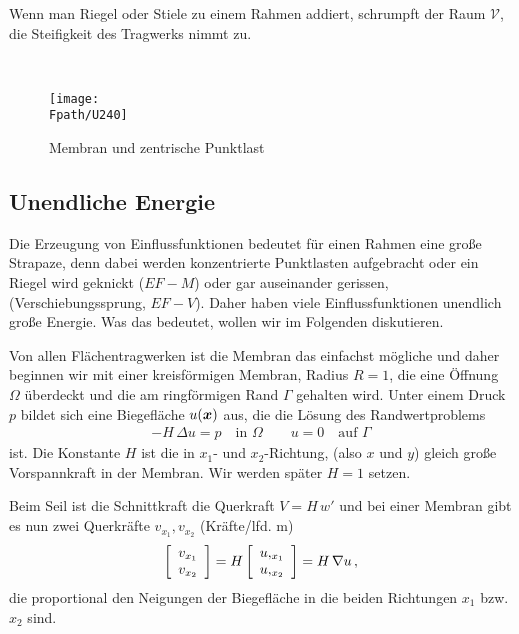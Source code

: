 {{{{{\hspace*{-12pt}\colorbox{highlightBlue}{\parbox{0.98\textwidth}{Wenn man Riegel oder Stiele zu einem Rahmen addiert, schrumpft der Raum $\mathcal{V}$, die Steifigkeit des Tragwerks nimmt zu.}}\\



\begin{figure}[tbp]
\centering
\if {} \sidecaption \fi
\texttt{[image: \\Fpath/U240]}
\caption{Membran und zentrische Punktlast}
\label{U240}
\end{figure}%

{\textcolor{sectionTitleBlue}{\section{Unendliche Energie}}}

Die Erzeugung von Einflussfunktionen bedeutet f\"{u}r einen Rahmen eine gro{\ss}e Strapaze, denn dabei werden konzentrierte Punktlasten aufgebracht oder ein Riegel wird geknickt ($EF\!-\!M$) oder gar auseinander gerissen, (Verschiebungssprung, $EF\!-\!V$). Daher haben viele Einflussfunktionen unendlich gro{\ss}e Energie. Was das bedeutet, wollen wir im Folgenden diskutieren.

Von allen Fl\"{a}chentragwerken ist die Membran das einfachst m\"{o}gliche und daher beginnen wir mit einer kreisf\"{o}rmigen Membran, Radius $R = 1$, die eine \"{O}ffnung $\Omega$ \"{u}berdeckt und die am ringf\"{o}rmigen Rand $\Gamma$ gehalten wird. Unter einem Druck $p$ bildet sich eine Biegefl\"{a}che $u(\vek x)$ aus, die die L\"{o}sung des Randwertproblems
\begin{align}
 - H\,\Delta u = p \quad \text{in $\Omega$} \qquad u = 0 \quad \text{auf $\Gamma$}
\end{align}
ist. Die Konstante $H$ ist die in $x_1$- und $x_2$-Richtung, (also $x$ und $y$) gleich gro{\ss}e Vorspannkraft in der Membran. Wir werden  sp\"{a}ter $H = 1$ setzen.

Beim Seil ist die Schnittkraft die Querkraft $V = H\,w'$ und bei einer Membran gibt es nun zwei Querkr\"{a}fte $v_{x_1}, v_{x_2}$ (Kr\"{a}fte/lfd. m)
\begin{align}
\left[ \barr {c }
      v_{x_1}  \\
      v_{x_2}
     \earr \right]= H \left[ \barr {c }
      u,_{x_1}  \\
      u,_{x_2}
     \earr \right]= H\,\nabla u\,,
\end{align}
die proportional den Neigungen der Biegefl\"{a}che in die beiden Richtungen $x_1$ bzw. $x_2$ sind.

}}}}}

